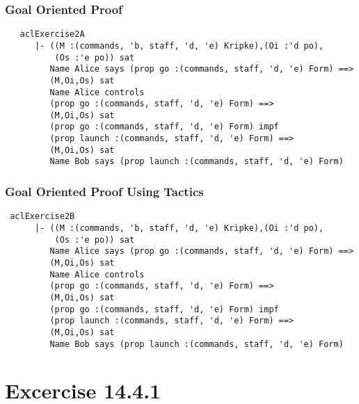 \documentclass{report}
\begin{document}
\subsection{Goal Oriented Proof}
\label{op-goal-proof-13-2}
\begin{session}
  \begin{scriptsize}
\begin{verbatim}
   aclExercise2A
      |- ((M :(commands, 'b, staff, 'd, 'e) Kripke),(Oi :'d po),
          (Os :'e po)) sat
         Name Alice says (prop go :(commands, staff, 'd, 'e) Form) ==>
         (M,Oi,Os) sat
         Name Alice controls
         (prop go :(commands, staff, 'd, 'e) Form) ==>
         (M,Oi,Os) sat
         (prop go :(commands, staff, 'd, 'e) Form) impf
         (prop launch :(commands, staff, 'd, 'e) Form) ==>
         (M,Oi,Os) sat
         Name Bob says (prop launch :(commands, staff, 'd, 'e) Form)
\end{verbatim}
  \end{scriptsize}
\end{session}

\subsection{Goal Oriented Proof Using Tactics}
\label{op-goal-proof-tacs-13-2}
\begin{session}
  \begin{scriptsize}
\begin{verbatim}
 aclExercise2B
      |- ((M :(commands, 'b, staff, 'd, 'e) Kripke),(Oi :'d po),
          (Os :'e po)) sat
         Name Alice says (prop go :(commands, staff, 'd, 'e) Form) ==>
         (M,Oi,Os) sat
         Name Alice controls
         (prop go :(commands, staff, 'd, 'e) Form) ==>
         (M,Oi,Os) sat
         (prop go :(commands, staff, 'd, 'e) Form) impf
         (prop launch :(commands, staff, 'd, 'e) Form) ==>
         (M,Oi,Os) sat
         Name Bob says (prop launch :(commands, staff, 'd, 'e) Form)
\end{verbatim}
  \end{scriptsize}
\end{session}



\chapter{Excercise 14.4.1}
\label{cha:14.4.1}
\end{document}
